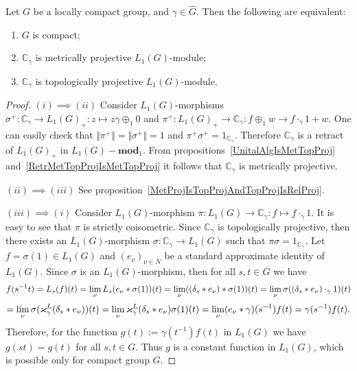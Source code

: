 \begin{proposition}\label{OneDimL1ModMetTopProjCharac} Let $G$ be a locally 
compact group, and $\gamma\in\widehat{G}$. Then the following are equivalent:

\begin{enumerate}[label = (\roman*)]
    \item $G$ is compact;

    \item $\mathbb{C}_\gamma$ is metrically projective $L_1(G)$-module;

    \item $\mathbb{C}_\gamma$ is topologically projective $L_1(G)$-module.
\end{enumerate}
\end{proposition}
\begin{proof} $(i)\implies (ii)$ Consider $L_1(G)$-morphisms 
$\sigma^+:\mathbb{C}_\gamma\to {L_1(G)}_+:z\mapsto z\gamma \oplus_1 0$ 
and $\pi^+:{L_1(G)}_+\to\mathbb{C}_\gamma: f\oplus_1 w\to f\cdot_{\gamma}1+w$. 
One can easily check 
that $\Vert\pi^+\Vert=\Vert\sigma^+\Vert=1$ 
and $\pi^+\sigma^+=1_{\mathbb{C}_\gamma}$. Therefore $\mathbb{C}_\gamma$ is a 
retract of ${L_1(G)}_+$ in $L_1(G)-\mathbf{mod}_1$. From 
propositions~\ref{UnitalAlgIsMetTopProj} 
and~\ref{RetrMetTopProjIsMetTopProj} it follows 
that $\mathbb{C}_\gamma$ is metrically projective.

$(ii)\implies (iii)$ See
proposition~\ref{MetProjIsTopProjAndTopProjIsRelProj}.

$(iii)\implies (i)$ Consider $L_1(G)$-morphism
$\pi:L_1(G)\to\mathbb{C}_\gamma:f\mapsto f\cdot_{\gamma} 1$. It is easy to see
that $\pi$ is strictly coisometric. Since $\mathbb{C}_\gamma$ is topologically
projective, then there exists an $L_1(G)$-morphism $\sigma:\mathbb{C}_\gamma\to
L_1(G)$ such that $\pi\sigma=1_{\mathbb{C}_\gamma}$. Let $f=\sigma(1)\in L_1(G)$
and ${(e_\nu)}_{\nu\in N}$ be a standard approximate identity of $L_1(G)$. Since
$\sigma$ is an $L_1(G)$-morphism, then for all $s,t\in G$ we have 
$$
f(s^{-1}t)
=L_s(f)(t)
=\lim_\nu L_s(e_\nu\ast \sigma(1))(t)
=\lim_\nu((\delta_s\ast e_\nu)\ast \sigma(1))(t)
=\lim_\nu\sigma((\delta_s\ast e_\nu)\cdot_{\gamma} 1)(t)
$$
$$
=\lim_\nu\sigma(\varkappa_\gamma^L(\delta_s\ast e_\nu))(t)
=\lim_\nu\varkappa_\gamma^L(\delta_s\ast e_\nu)\sigma(1)(t)
=\lim_\nu(e_\nu\ast\gamma)(s^{-1})f(t)
=\gamma(s^{-1})f(t).
$$
Therefore, for the function $g(t):=\gamma(t^{-1})f(t)$ in $L_1(G)$ we have
$g(st)=g(t)$ for all $s,t\in G$. Thus $g$ is a constant function in $L_1(G)$,
which is possible only for compact group $G$.
\end{proof}

